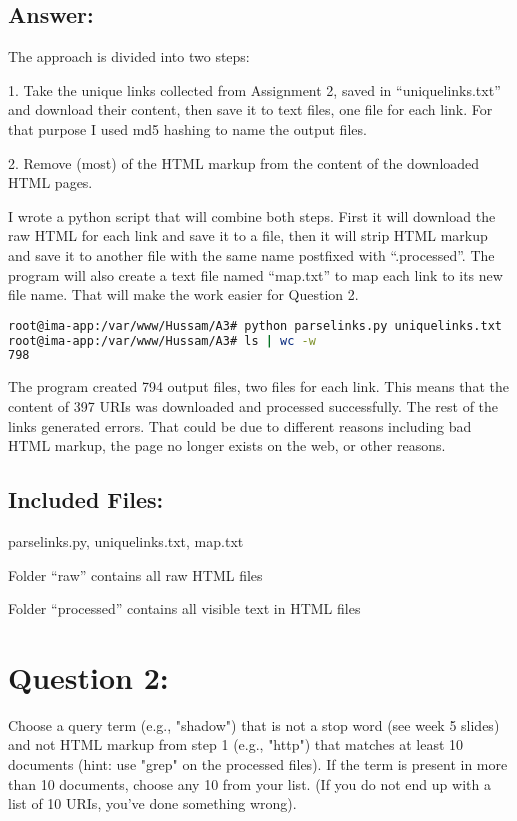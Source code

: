 \documentclass[a4paper, 11pt]{article}
\begin{document}
\subsection*{Answer:}
The approach is divided into two steps:

1. Take the unique links collected from Assignment 2, saved in ``uniquelinks.txt'' and download their content, then save it to text files, one file for each link. For that purpose I used md5 hashing to name the output files.

2. Remove (most) of the HTML markup from the content of the downloaded HTML pages.

I wrote a python script that will combine both steps. First it will download the raw HTML for each link and save it to a file, then it will strip HTML markup and save it to another file with the same name postfixed with ``.processed''. The program will also create a text file named ``map.txt'' to map each link to its new file name. That will make the work easier for Question 2.


\pagebreak

\begin{lstlisting}[language=bash, breakatwhitespace=〈false), label=running parselinks.py, caption= Running parselinks.py to download raw HTML and visible text from URIs]
root@ima-app:/var/www/Hussam/A3# python parselinks.py uniquelinks.txt
root@ima-app:/var/www/Hussam/A3# ls | wc -w
798
\end{lstlisting}


The program created 794 output files, two files for each link. This means that the content of 397 URIs was downloaded and processed successfully. The rest of the links generated errors. That could be due to different reasons including bad HTML markup, the page no longer exists on the web, or other reasons. 


\subsection*{Included Files:}
parselinks.py, uniquelinks.txt, map.txt

\noindent
Folder ``raw'' contains all raw HTML files
 
\noindent
Folder ``processed'' contains all visible text in HTML files

\section*{Question 2:}
Choose a query term (e.g., "shadow") that is not a stop word
(see week 5 slides) and not HTML markup from step 1 (e.g., "http")
that matches at least 10 documents (hint: use "grep" on the processed
files).  If the term is present in more than 10 documents, choose
any 10 from your list.  (If you do not end up with a list of 10
URIs, you've done something wrong).
\end{document}
